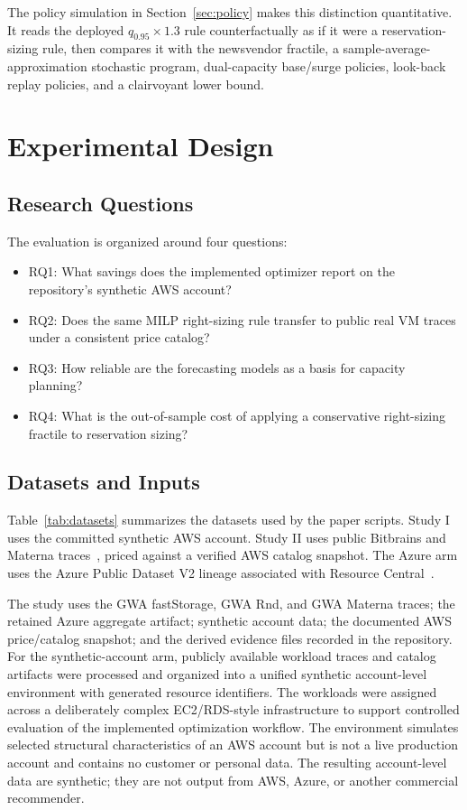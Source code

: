\documentclass[conference]{IEEEtran}
\begin{document}
The policy simulation in Section~\ref{sec:policy} makes this distinction
quantitative. It reads the deployed $q_{0.95}\times1.3$ rule counterfactually
as if it were a reservation-sizing rule, then compares it with the newsvendor
fractile, a sample-average-approximation stochastic program, dual-capacity
base/surge policies, look-back replay policies, and a clairvoyant lower bound.

\section{Experimental Design}

\subsection{Research Questions}
The evaluation is organized around four questions:
\begin{itemize}
\item RQ1: What savings does the implemented optimizer report on the
repository's synthetic AWS account?
\item RQ2: Does the same MILP right-sizing rule transfer to public real VM
traces under a consistent price catalog?
\item RQ3: How reliable are the forecasting models as a basis for capacity
planning?
\item RQ4: What is the out-of-sample cost of applying a conservative
right-sizing fractile to reservation sizing?
\end{itemize}

\subsection{Datasets and Inputs}
Table~\ref{tab:datasets} summarizes the datasets used by the paper scripts.
Study I uses the committed synthetic AWS account. Study II uses public
Bitbrains and Materna traces~\cite{shen2015bitbrains,iosup2008gwa}, priced
against a verified AWS catalog snapshot. The Azure arm uses the Azure Public
Dataset V2 lineage associated with Resource Central~\cite{cortez2017resource}.

The study uses the GWA fastStorage, GWA Rnd, and GWA Materna traces; the
retained Azure aggregate artifact; synthetic account data; the documented AWS
price/catalog snapshot; and the derived evidence files recorded in the
repository. For the synthetic-account arm, publicly available workload traces
and catalog artifacts were processed and organized into a unified synthetic
account-level environment with generated resource identifiers. The workloads
were assigned across a deliberately complex EC2/RDS-style infrastructure to
support controlled evaluation of the implemented optimization workflow. The
environment simulates selected structural characteristics of an AWS account
but is not a live production account and contains no customer or personal
data. The resulting account-level data are synthetic; they are not output from
AWS, Azure, or another commercial recommender.
\end{document}
